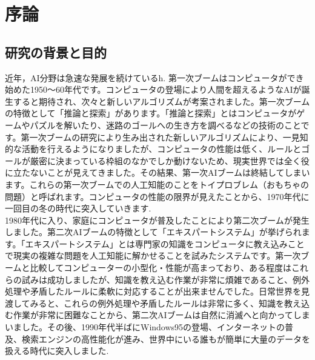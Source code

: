 \chapter{序論}
\section{研究の背景と目的}
近年，AI分野は急速な発展を続けているh.
第一次ブームはコンピュータができ始めた1950～60年代です。コンピュータの登場により人間を超えるようなAIが誕生すると期待され、次々と新しいアルゴリズムが考案されました。第一次ブームの特徴として「推論と探索」があります。「推論と探索」とはコンピュータがゲームやパズルを解いたり、迷路のゴールへの生き方を調べるなどの技術のことです。第一次ブームの研究により生み出された新しいアルゴリズムにより、一見知的な活動を行えるようになりましたが、コンピュータの性能は低く、ルールとゴールが厳密に決まっている枠組のなかでしか動けないため、現実世界では全く役に立たないことが見えてきました。その結果、第一次AIブームは終結してしまいます。これらの第一次ブームでの人工知能のことをトイプロブレム（おもちゃの問題）と呼ばれます。コンピュータの性能の限界が見えたことから、1970年代に一回目の冬の時代に突入していきます.\\
1980年代に入り、家庭にコンピュータが普及したことにより第二次ブームが発生しました。第二次AIブームの特徴として「エキスパートシステム」が挙げられます。「エキスパートシステム」とは専門家の知識をコンピュータに教え込みことで現実の複雑な問題を人工知能に解かせることを試みたシステムです。第一次ブームと比較してコンピューターの小型化・性能が高まっており、ある程度はこれらの試みは成功しましたが、知識を教え込む作業が非常に煩雑であること、例外処理や矛盾したルールに柔軟に対応することが出来ませんでした。日常世界を見渡してみると、これらの例外処理や矛盾したルールは非常に多く、知識を教え込む作業が非常に困難なことから、第二次AIブームは自然に消滅へと向かってしまいました。その後、1990年代半ばにWindows95の登場、インターネットの普及、検索エンジンの高性能化が進み、世界中にいる誰もが簡単に大量のデータを扱える時代に突入しました.\\
